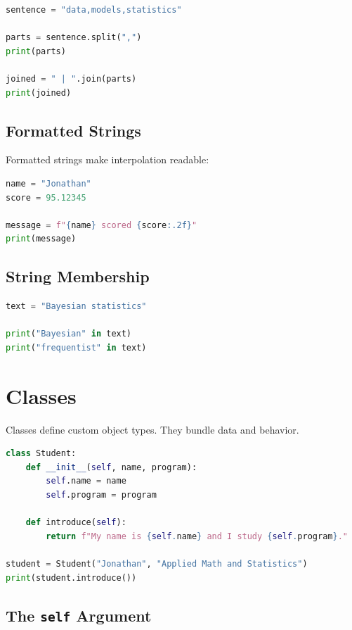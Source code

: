 \documentclass[12pt,oneside]{book}
\numberwithin{equation}{section}
\theoremstyle{definition}
\theoremstyle{plain}
\theoremstyle{remark}
\begin{document}
\begin{lstlisting}[language=Python]
sentence = "data,models,statistics"

parts = sentence.split(",")
print(parts)

joined = " | ".join(parts)
print(joined)
\end{lstlisting}

\subsection{Formatted Strings}

Formatted strings make interpolation readable:
\begin{lstlisting}[language=Python]
name = "Jonathan"
score = 95.12345

message = f"{name} scored {score:.2f}"
print(message)
\end{lstlisting}

\subsection{String Membership}

\begin{lstlisting}[language=Python]
text = "Bayesian statistics"

print("Bayesian" in text)
print("frequentist" in text)
\end{lstlisting}

\section{Classes}

Classes define custom object types. They bundle data and behavior.

\begin{lstlisting}[language=Python]
class Student:
    def __init__(self, name, program):
        self.name = name
        self.program = program

    def introduce(self):
        return f"My name is {self.name} and I study {self.program}."

student = Student("Jonathan", "Applied Math and Statistics")
print(student.introduce())
\end{lstlisting}

\subsection{The \texttt{self} Argument}
\end{document}
